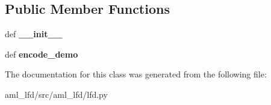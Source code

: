 \subsection*{Public Member Functions}
\begin{DoxyCompactItemize}
\item 
\hypertarget{classaml__lfd_1_1lfd_1_1_lf_d_aab9046d6d3824e7bfeea0eddbfe5054f}{def {\bfseries \-\_\-\-\_\-init\-\_\-\-\_\-}}\label{classaml__lfd_1_1lfd_1_1_lf_d_aab9046d6d3824e7bfeea0eddbfe5054f}

\item 
\hypertarget{classaml__lfd_1_1lfd_1_1_lf_d_a0f3dff0ab9b2d70047d3a2679cd5152e}{def {\bfseries encode\-\_\-demo}}\label{classaml__lfd_1_1lfd_1_1_lf_d_a0f3dff0ab9b2d70047d3a2679cd5152e}

\end{DoxyCompactItemize}


The documentation for this class was generated from the following file\-:\begin{DoxyCompactItemize}
\item 
aml\-\_\-lfd/src/aml\-\_\-lfd/lfd.\-py\end{DoxyCompactItemize}
